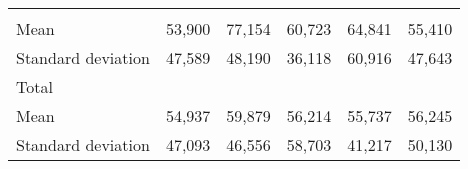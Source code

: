 \begin{tabular}{llllll}
  \multicolumn{1}{|r}{} &
  \multicolumn{1}{r}{} &
  \multicolumn{1}{r}{} &
  \multicolumn{1}{r}{} &
  \multicolumn{1}{r}{} \\
\multicolumn{1}{l}{\hspace{4em}Mean} &
  \multicolumn{1}{|r}{53,900} &
  \multicolumn{1}{r}{77,154} &
  \multicolumn{1}{r}{60,723} &
  \multicolumn{1}{r}{64,841} &
  \multicolumn{1}{r}{55,410} \\
\multicolumn{1}{l}{\hspace{4em}Standard deviation} &
  \multicolumn{1}{|r}{47,589} &
  \multicolumn{1}{r}{48,190} &
  \multicolumn{1}{r}{36,118} &
  \multicolumn{1}{r}{60,916} &
  \multicolumn{1}{r}{47,643} \\
\multicolumn{1}{l}{\hspace{3em}Total} &
  \multicolumn{1}{|r}{} &
  \multicolumn{1}{r}{} &
  \multicolumn{1}{r}{} &
  \multicolumn{1}{r}{} &
  \multicolumn{1}{r}{} \\
\multicolumn{1}{l}{\hspace{4em}Mean} &
  \multicolumn{1}{|r}{54,937} &
  \multicolumn{1}{r}{59,879} &
  \multicolumn{1}{r}{56,214} &
  \multicolumn{1}{r}{55,737} &
  \multicolumn{1}{r}{56,245} \\
\multicolumn{1}{l}{\hspace{4em}Standard deviation} &
  \multicolumn{1}{|r}{47,093} &
  \multicolumn{1}{r}{46,556} &
  \multicolumn{1}{r}{58,703} &
  \multicolumn{1}{r}{41,217} &
  \multicolumn{1}{r}{50,130} \\
\cline{1-6}
\end{tabular}

